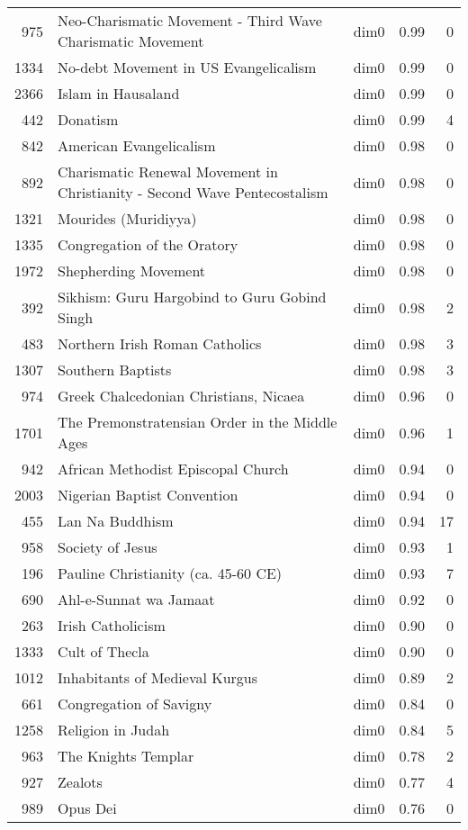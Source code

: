\begin{tabular}{rllrr}
975 & Neo-Charismatic Movement - Third Wave Charismatic Movement & dim0 & 0.99 & 0 \\
1334 & No-debt Movement in US Evangelicalism & dim0 & 0.99 & 0 \\
2366 & Islam in Hausaland & dim0 & 0.99 & 0 \\
442 & Donatism & dim0 & 0.99 & 4 \\
842 & American Evangelicalism & dim0 & 0.98 & 0 \\
892 & Charismatic Renewal Movement in Christianity - Second Wave Pentecostalism & dim0 & 0.98 & 0 \\
1321 & Mourides (Muridiyya) & dim0 & 0.98 & 0 \\
1335 & Congregation of the Oratory & dim0 & 0.98 & 0 \\
1972 & Shepherding Movement & dim0 & 0.98 & 0 \\
392 & Sikhism: Guru Hargobind to Guru Gobind Singh & dim0 & 0.98 & 2 \\
483 & Northern Irish Roman Catholics & dim0 & 0.98 & 3 \\
1307 & Southern Baptists & dim0 & 0.98 & 3 \\
974 & Greek Chalcedonian Christians, Nicaea & dim0 & 0.96 & 0 \\
1701 & The Premonstratensian Order in the Middle Ages & dim0 & 0.96 & 1 \\
942 & African Methodist Episcopal Church & dim0 & 0.94 & 0 \\
2003 & Nigerian Baptist Convention & dim0 & 0.94 & 0 \\
455 & Lan Na Buddhism & dim0 & 0.94 & 17 \\
958 & Society of Jesus & dim0 & 0.93 & 1 \\
196 & Pauline Christianity (ca. 45-60 CE) & dim0 & 0.93 & 7 \\
690 & Ahl-e-Sunnat wa Jamaat & dim0 & 0.92 & 0 \\
263 & Irish Catholicism & dim0 & 0.90 & 0 \\
1333 & Cult of Thecla & dim0 & 0.90 & 0 \\
1012 & Inhabitants of Medieval Kurgus & dim0 & 0.89 & 2 \\
661 & Congregation of Savigny & dim0 & 0.84 & 0 \\
1258 & Religion in Judah & dim0 & 0.84 & 5 \\
963 & The Knights Templar & dim0 & 0.78 & 2 \\
927 & Zealots & dim0 & 0.77 & 4 \\
989 & Opus Dei & dim0 & 0.76 & 0 \\

\end{tabular}
